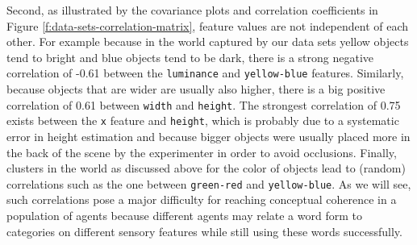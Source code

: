 Second, as illustrated by the covariance plots and correlation
coefficients in Figure \ref{f:data-sets-correlation-matrix}, feature
values are not independent of each other. For example because in the
world captured by our data sets yellow objects tend to bright and blue
objects tend to be dark, there is a strong negative correlation of
-0.61 between the \texttt{luminance} and \texttt{yellow-blue}
features. Similarly, because objects that are wider are usually also
higher, there is a big positive correlation of 0.61 between
\texttt{width} and \texttt{height}. The strongest correlation of 0.75
exists between the \texttt{x} feature and \texttt{height}, which is
probably due to a systematic error in height estimation and because
bigger objects were usually placed more in the back of the scene by
the experimenter in order to avoid occlusions. Finally, clusters in
the world as discussed above for the color of objects lead to (random)
correlations such as the one between \texttt{green-red} and
\texttt{yellow-blue}. As we will see, such correlations pose a major
difficulty for reaching conceptual coherence in a population of agents
because different agents may relate a word form to categories on
different sensory features while still using these words successfully.





